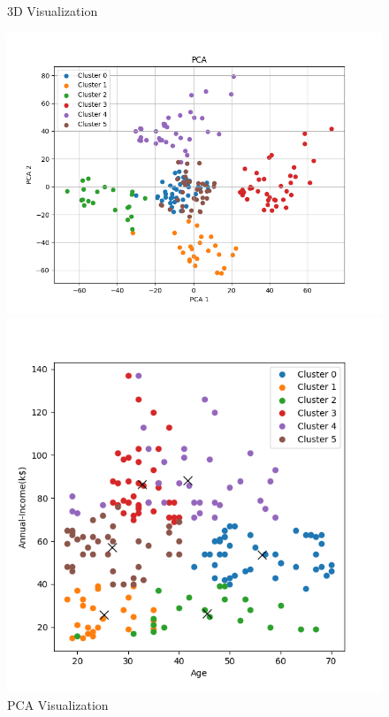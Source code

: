 \documentclass[8pt]{article}
\begin{document}
\begin{figure}[H]
\begin{minipage}{0.32\textwidth}
        \caption{3D Visualization}
        \label{fig: 3D k6 com con w}
    \end{minipage}
    \hfill
    \begin{minipage}{0.32\textwidth}
        \centering
        \includegraphics[width=\textwidth]{./Prob4/out/task3_1_com/images/PCA_k6.png}
        \caption{PCA Visualization}
        \label{PCA k6 com con w}
    \end{minipage}
    \hfill
    \begin{minipage}{0.32\textwidth}
        \centering
        \includegraphics[width=\textwidth]{./Prob4/out/task3_1_com/images/cluster_result_k6_0_1.png}

\end{minipage}
\end{figure}
\end{document}
